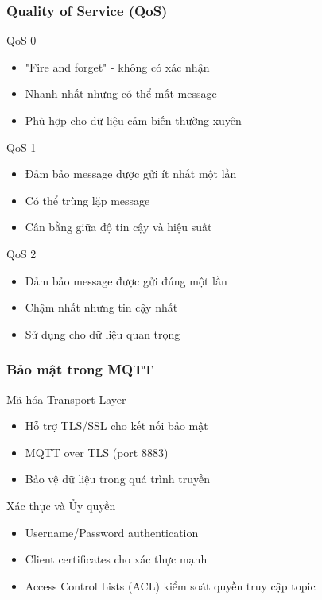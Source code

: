 \begin{frame}
\frametitle{Quality of Service (QoS)}

\begin{block}{QoS 0}
\begin{itemize}
\item "Fire and forget" - không có xác nhận
\item Nhanh nhất nhưng có thể mất message
\item Phù hợp cho dữ liệu cảm biến thường xuyên
\end{itemize}
\end{block}

\begin{block}{QoS 1}
\begin{itemize}
\item Đảm bảo message được gửi ít nhất một lần
\item Có thể trùng lặp message
\item Cân bằng giữa độ tin cậy và hiệu suất
\end{itemize}
\end{block}

\begin{block}{QoS 2}
\begin{itemize}
\item Đảm bảo message được gửi đúng một lần
\item Chậm nhất nhưng tin cậy nhất
\item Sử dụng cho dữ liệu quan trọng
\end{itemize}
\end{block}

\end{frame}


\begin{frame}
\frametitle{Bảo mật trong MQTT}

\begin{block}{Mã hóa Transport Layer}
\begin{itemize}
\item Hỗ trợ TLS/SSL cho kết nối bảo mật
\item MQTT over TLS (port 8883)
\item Bảo vệ dữ liệu trong quá trình truyền
\end{itemize}
\end{block}

\begin{block}{Xác thực và Ủy quyền}
\begin{itemize}
\item Username/Password authentication
\item Client certificates cho xác thực mạnh
\item Access Control Lists (ACL) kiểm soát quyền truy cập topic
\end{itemize}
\end{block}
\end{frame}

